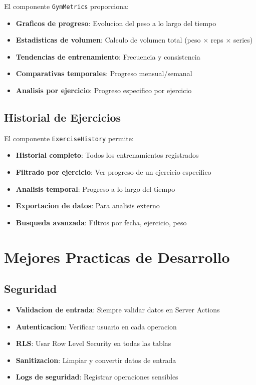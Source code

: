 \documentclass[12pt,a4paper]{article}
\begin{document}
El componente \texttt{GymMetrics} proporciona:

\begin{itemize}
    \item \textbf{Graficos de progreso}: Evolucion del peso a lo largo del tiempo
    \item \textbf{Estadisticas de volumen}: Calculo de volumen total (peso × reps × series)
    \item \textbf{Tendencias de entrenamiento}: Frecuencia y consistencia
    \item \textbf{Comparativas temporales}: Progreso mensual/semanal
    \item \textbf{Analisis por ejercicio}: Progreso especifico por ejercicio
\end{itemize}

\subsection{Historial de Ejercicios}

El componente \texttt{ExerciseHistory} permite:

\begin{itemize}
    \item \textbf{Historial completo}: Todos los entrenamientos registrados
    \item \textbf{Filtrado por ejercicio}: Ver progreso de un ejercicio especifico
    \item \textbf{Analisis temporal}: Progreso a lo largo del tiempo
    \item \textbf{Exportacion de datos}: Para analisis externo
    \item \textbf{Busqueda avanzada}: Filtros por fecha, ejercicio, peso
\end{itemize}

\section{Mejores Practicas de Desarrollo}

\subsection{Seguridad}

\begin{itemize}
    \item \textbf{Validacion de entrada}: Siempre validar datos en Server Actions
    \item \textbf{Autenticacion}: Verificar usuario en cada operacion
    \item \textbf{RLS}: Usar Row Level Security en todas las tablas
    \item \textbf{Sanitizacion}: Limpiar y convertir datos de entrada
    \item \textbf{Logs de seguridad}: Registrar operaciones sensibles
\end{itemize}
\end{document}
